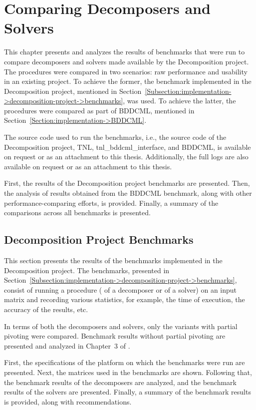 \chapter{Comparing Decomposers and Solvers}\label{Chapter:comparing-decomposers-and-solvers}

This chapter presents and analyzes the results of benchmarks that were run to compare decomposers and solvers made available by the Decomposition project.
The procedures were compared in two scenarios: raw performance and usability in an existing project.
To achieve the former, the benchmark implemented in the Decomposition project, mentioned in Section~\ref{Subsection:implementation->decomposition-project->benchmarks}, was used.
To achieve the latter, the procedures were compared as part of BDDCML, mentioned in Section~\ref{Section:implementation->BDDCML}.

The source code used to run the benchmarks, i.e., the source code of the Decomposition project, TNL, tnl\_bddcml\_interface, and BDDCML, is available on request or as an attachment to this thesis.
Additionally, the full logs are also available on request or as an attachment to this thesis.

First, the results of the Decomposition project benchmarks are presented.
Then, the analysis of results obtained from the BDDCML benchmark, along with other performance-comparing efforts, is provided.
Finally, a summary of the comparisons across all benchmarks is presented.

\section{Decomposition Project Benchmarks}\label{Section:comparing-decomposers-and-solvers->decomposition-project-benchmarks}
This section presents the results of the benchmarks implemented in the Decomposition project.
The benchmarks, presented in Section~\ref{Subsection:implementation->decomposition-project->benchmarks}, consist of running a procedure ( of a decomposer or  of a solver) on an input matrix and recording various statistics, for example, the time of execution, the accuracy of the results, etc.

In terms of both the decomposers and solvers, only the variants with partial pivoting were compared.
Benchmark results without partial pivoting are presented and analyzed in Chapter~3 of  \cite{Cejka2022}.

First, the specifications of the platform on which the benchmarks were run are presented.
Next, the matrices used in the benchmarks are shown.
Following that, the benchmark results of the decomposers are analyzed, and the benchmark results of the solvers are presented.
Finally, a summary of the benchmark results is provided, along with recommendations.

